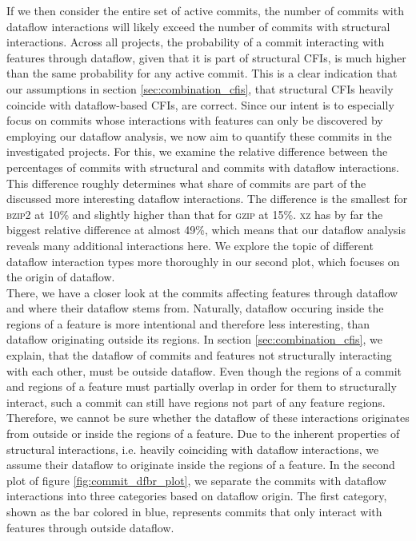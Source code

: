 If we then consider the entire set of active commits, the number of commits with dataflow interactions will likely exceed the number of commits with structural interactions.
Across all projects, the probability of a commit interacting with features through dataflow, given that it is part of structural CFIs, is much higher than the same probability for any active commit.
This is a clear indication that our assumptions in section \ref{sec:combination_cfis}, that structural CFIs heavily coincide with dataflow-based CFIs, are correct.
Since our intent is to especially focus on commits whose interactions with features can only be discovered by employing our dataflow analysis, we now aim to quantify these commits in the investigated projects.
For this, we examine the relative difference between the percentages of commits with structural and commits with dataflow interactions.
This difference roughly determines what share of commits are part of the discussed more interesting dataflow interactions.
The difference is the smallest for \textsc{bzip2} at 10\% and slightly higher than that for \textsc{gzip} at 15\%.
\textsc{xz} has by far the biggest relative difference at almost 49\%, which means that our dataflow analysis reveals many additional interactions here.
We explore the topic of different dataflow interaction types more thoroughly in our second plot, which focuses on the \textsf{origin} of dataflow. \\
There, we have a closer look at the commits affecting features through dataflow and where their dataflow stems from.
Naturally, dataflow occuring inside the regions of a feature is more intentional and therefore less interesting, than dataflow originating outside its regions.
In section \ref{sec:combination_cfis}, we explain, that the dataflow of commits and features not structurally interacting with each other, must be outside dataflow.
Even though the regions of a commit and regions of a feature must partially overlap in order for them to structurally interact, such a commit can still have regions not part of any feature regions.
Therefore, we cannot be sure whether the dataflow of these interactions originates from outside or inside the regions of a feature.
Due to the inherent properties of structural interactions, i.e. heavily coinciding with dataflow interactions, we assume their dataflow to originate inside the regions of a feature.
In the second plot of figure \ref{fig:commit_dfbr_plot}, we separate the commits with dataflow interactions into three categories based on dataflow origin.
The first category, shown as the bar colored in blue, represents commits that only interact with features through outside dataflow.
